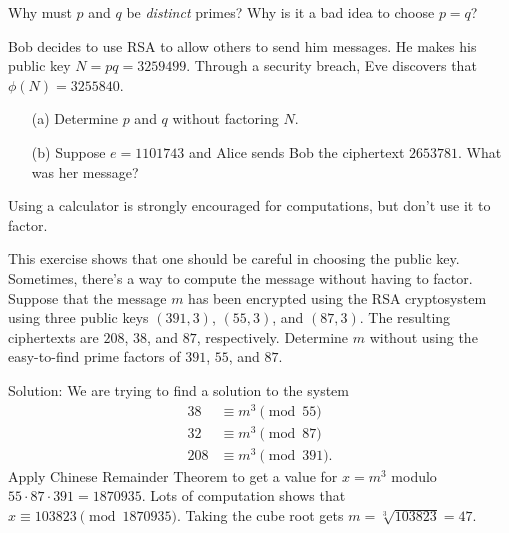 \documentclass{article}
\begin{document}
    \begin{exercise}
        Why must \(p\) and \(q\) be \textit{distinct} primes?
        Why is it a bad idea to choose \(p=q\)?
    \end{exercise}
    \iffalse
    Solution:
    There are a few reasons, but the most clear one is that \(p\) is easy to recover by computing \(\sqrt{N}\).
    \(\sqrt{N}=\sqrt{pq}\) is an integer if and only if \(p=q\).
    \fi

    \begin{exercise}
        Bob decides to use RSA to allow others to send him messages.
        He makes his public key \(N=pq=3259499\).
        Through a security breach, Eve discovers that \(\phi(N)=3255840\).
        \begin{enumerate}
            \item[(a)] Determine \(p\) and \(q\) without factoring \(N\).
            \item[(b)] Suppose \(e=1101743\) and Alice sends Bob the ciphertext \(2653781\).
            What was her message? 
        \end{enumerate}
        Using a calculator is strongly encouraged for computations, but don't use it to factor.
    \end{exercise}
    \iffalse
    Solution:
    \begin{enumerate}
        \item[(a)] \((p-1)(q-1)=N-(p+q)+1\).
        From this, obtain \(p+q\) and then solve the quadratic \((X-p)(X-q)=X^2-(p+q)X+pq\) using the quadratic formula.
        You should get \(p=1531\) and \(q=2129\) (up to reordering of \(p\) and \(q\)).
        \item[(b)] Use the reverse Euclidean algorithm to get \(d\) and then compute \(m\) using \(c^d\pmod{N}\).
        I don't have the numerical answer, but these computations will work.
    \end{enumerate}
    \fi

    \begin{exercise}
        This exercise shows that one should be careful in choosing the public key.
        Sometimes, there's a way to compute the message without having to factor.
        Suppose that the message \(m\) has been encrypted using the RSA cryptosystem using three public keys \((391,3)\), \((55,3)\), and \((87,3)\).
        The resulting ciphertexts are \(208\), \(38\), and \(87\), respectively.
        Determine \(m\) without using the easy-to-find prime factors of \(391\), \(55\), and \(87\).
    \end{exercise}
    \iffalse
    Solution:
    We are trying to find a solution to the system
    \begin{align*}
        38 &\equiv m^3 \pmod{55}\\
        32 &\equiv m^3 \pmod{87}\\
        208 &\equiv m^3 \pmod{391}.
    \end{align*}
    Apply Chinese Remainder Theorem to get a value for \(x = m^3\) modulo \(55\cdot 87\cdot 391 = 1870935\).
    Lots of computation shows that \(x \equiv 103823\pmod{1870935}\).
    Taking the cube root gets \(m = \sqrt[3]{103823} = 47\).
\end{document}
